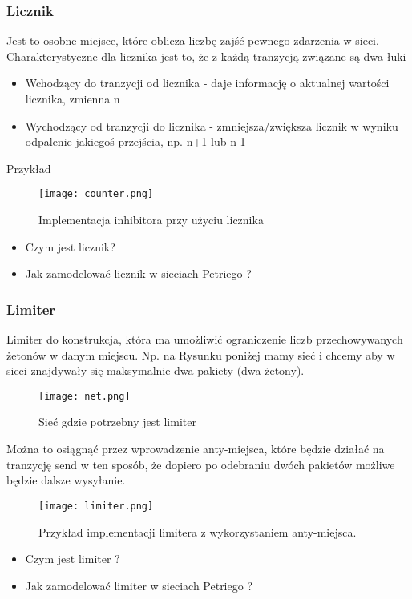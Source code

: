 \documentclass[a4paper,15pt]{article}
\begin{document}
\subsubsection{Licznik}
Jest to osobne miejsce, które oblicza liczbę zajść pewnego zdarzenia w sieci. Charakterystyczne dla licznika jest to, że z każdą tranzycją związane są dwa łuki
\begin{itemize}
\item Wchodzący do tranzycji od licznika - daje informację o aktualnej wartości licznika, zmienna n
\item Wychodzący od tranzycji do licznika - zmniejsza/zwiększa licznik w wyniku odpalenie jakiegoś przejścia, np. n+1 lub n-1
\end{itemize}
Przykład 
\begin{figure}[H]
\centerline{\texttt{[image: counter.png]}}
\caption{Implementacja inhibitora przy użyciu licznika}
\label{fig:counter}
\end{figure}


\begin{framed}
\begin{itemize}
\item Czym jest licznik?
\item Jak zamodelować licznik w sieciach Petriego ?
\end{itemize}
\end{framed}


\subsubsection{Limiter}
Limiter do konstrukcja, która ma umożliwić ograniczenie liczb przechowywanych żetonów w danym miejscu. Np. na Rysunku poniżej mamy sieć i chcemy aby w sieci znajdywały się maksymalnie dwa pakiety (dwa żetony).
\begin{figure}[H]
\centerline{\texttt{[image: net.png]}}
\caption{Sieć gdzie potrzebny jest limiter}
\label{fig:net}
\end{figure}
Można to osiągnąć przez wprowadzenie anty-miejsca, które będzie działać na tranzycję send w ten sposób, że dopiero po odebraniu dwóch pakietów możliwe będzie dalsze wysyłanie.
\begin{figure}[H]
\centerline{\texttt{[image: limiter.png]}}
\caption{Przykład implementacji limitera z wykorzystaniem anty-miejsca.}
\label{fig:limiter}
\end{figure}

\begin{framed}
\begin{itemize}
\item Czym jest limiter ?
\item Jak zamodelować limiter w sieciach Petriego ?
\end{itemize}
\end{framed}
\end{document}
